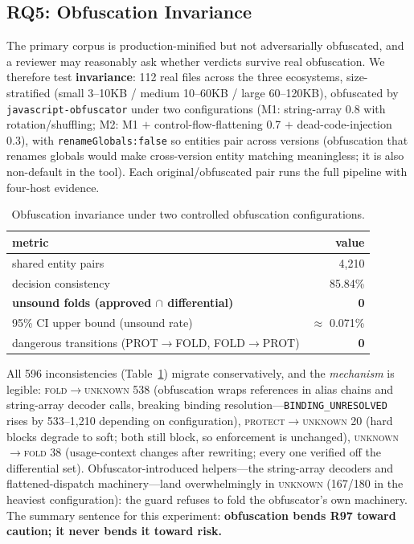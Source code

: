 \documentclass[sigconf,nonacm]{acmart}
\begin{document}
\subsection{RQ5: Obfuscation Invariance}\label{sec:rq5}

The primary corpus is production-minified but not adversarially obfuscated, and a reviewer may reasonably ask whether verdicts survive real obfuscation. We therefore test \textbf{invariance}: 112 real files across the three ecosystems, size-stratified (small 3--10KB / medium 10--60KB / large 60--120KB), obfuscated by \texttt{javascript-obfuscator} under two configurations (M1: string-array 0.8 with rotation/shuffling; M2: M1 $+$ control-flow-flattening 0.7 $+$ dead-code-injection 0.3), with \texttt{renameGlobals:false} so entities pair across versions (obfuscation that renames globals would make cross-version entity matching meaningless; it is also non-default in the tool). Each original/obfuscated pair runs the full pipeline with four-host evidence.

\begin{table}[t]
  \centering
  \caption{Obfuscation invariance under two controlled obfuscation configurations.}
  \label{tab:obfuscation}
  \small
  \begin{tabular}{lr}
    \toprule
    metric & value \\
    \midrule
    shared entity pairs & 4{,}210 \\
    decision consistency & 85.84\% \\
    \textbf{unsound folds (approved $\cap$ differential)} & \textbf{0} \\
    95\% CI upper bound (unsound rate) & $\approx$ 0.071\% \\
    dangerous transitions (PROT$\to$FOLD, FOLD$\to$PROT) & \textbf{0} \\
    \bottomrule
  \end{tabular}
\end{table}

All 596 inconsistencies (Table~\ref{tab:obfuscation}) migrate conservatively, and the \emph{mechanism} is legible: \textsc{fold}$\to$\textsc{unknown} 538 (obfuscation wraps references in alias chains and string-array decoder calls, breaking binding resolution---\texttt{BINDING\_UNRESOLVED} rises by 533--1{,}210 depending on configuration), \textsc{protect}$\to$\textsc{unknown} 20 (hard blocks degrade to soft; both still block, so enforcement is unchanged), \textsc{unknown}$\to$\textsc{fold} 38 (usage-context changes after rewriting; every one verified off the differential set). Obfuscator-introduced helpers---the string-array decoders and flattened-dispatch machinery---land overwhelmingly in \textsc{unknown} (167/180 in the heaviest configuration): the guard refuses to fold the obfuscator's own machinery. The summary sentence for this experiment: \textbf{obfuscation bends R97 toward caution; it never bends it toward risk.}
\end{document}
